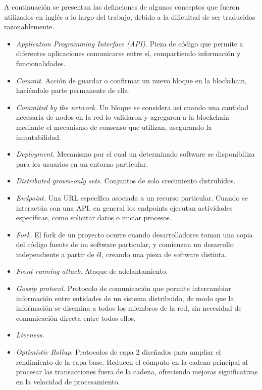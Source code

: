 A continuación se presentan las definciones de algunos conceptos que fueron utilizados
en inglés a lo largo del trabajo, debido a la dificultad de ser traducidos razonablemente.
\begin{itemize}
     \item \textit{Application Programming Interface (API).}  Pieza de código que permite a diferentes
     aplicaciones comunicarse entre sí, compartiendo información y funcionalidades.
     \item \textit{Commit.} Acción de guardar o confirmar un nuevo bloque en la
     blockchain, haciéndolo parte permanente de ella.
     \item \textit{Commited by the network.} Un bloque se considera así cuando una cantidad necesaria de nodos
     en la red lo validaron y agregaron a la blockchain mediante el mecanismo de consenso que utilizan,
     asegurando la inmutabilidad. 
     \item \textit{Deployment.} Mecanismo por el cual un determinado software se disponibiliza para los usuarios
     en un entorno particular.
     \item \textit{Distributed grown-only sets.} Conjuntos de solo crecimiento distrubídos.
     \item \textit{Endpoint.} Una URL específica asociada a un recurso particular. Cuando se interactúa con una API,
     en general los endpoints ejecutan actividades específicas, como solicitar datos o iniciar procesos.
     \item \textit{Fork.} El fork de un proyecto ocurre cuando desarrolladores toman una copia del código fuente de
     un software particular, y comienzan un desarrollo independiente a partir de él, creando una pieza de software
     distinta.
     \item \textit{Front-running attack.} Ataque de adelantamiento.
     \item \textit{Gossip protocol.} Protocolo de comunicación que permite intercambiar información
     entre entidades de un sistema distribuido, de modo que la información se disemina a todos los miembros de la red,
     sin necesidad de comunicación directa entre todos ellos.
     \item \textit{Liveness.}
     \item \textit{Optimistic Rollup.} Protocolos de capa 2 diseñados para ampliar el rendimiento de la capa base.
     Reducen el cómputo en la cadena principal al procesar las transacciones fuera de la cadena, ofreciendo mejoras
     significativas en la velocidad de procesamiento.

\end{itemize}
